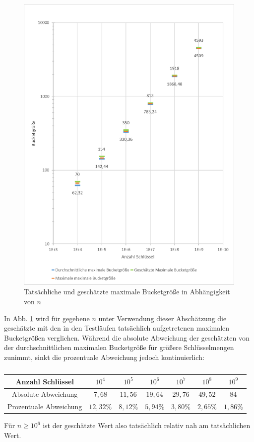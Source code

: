 \documentclass[a4paper,12pt,twoside]{report}
\begin{document}
\begin{figure}[tbhp]
\centering
\includegraphics[width=\textwidth]{diagrams/TatsaechlicheUndGeschaetzteMaximaleBucketgroesse.png}
\caption{Tatsächliche und geschätzte maximale Bucketgröße in Abhängigkeit von $n$}
\label{img:tatsaechlicheUndGeschaetzteMaximaleBucketgroesse}
\end{figure}

In Abb. \ref{img:tatsaechlicheUndGeschaetzteMaximaleBucketgroesse} wird für gegebene $n$ unter Verwendung dieser Abschätzung die geschätzte mit den in den Testläufen tatsächlich aufgetretenen maximalen Bucketgrößen verglichen.
Während die absolute Abweichung der geschätzten von der durchschnittlichen maximalen Bucketgröße für größere Schlüsselmengen zunimmt, sinkt die prozentuale Abweichung jedoch kontinuierlich:

\begin{table}[H]
\centering
\begin{tabular}{|c|c|c|c|c|c|c|}
\hline 
Anzahl Schlüssel & $10^4$ & $10^5$ & $10^6$ & $10^7$ & $10^8$ & $10^9$ \\ 
\hline 
Absolute Abweichung & $7,68$ & $11,56$ & $19,64$ & $29,76$ & $49,52$ & $84$ \\ 
\hline 
Prozentuale Abweichung & $12,32\%$ & $8,12\%$ & $5,94\%$ & $3,80\%$ & $2,65\%$ & $1,86\%$ \\ 
\hline 
\end{tabular}
\caption{}
\end{table}
Für $n\geq 10^6$ ist der geschätzte Wert also tatsächlich relativ nah am tatsächlichen Wert.
\end{document}
